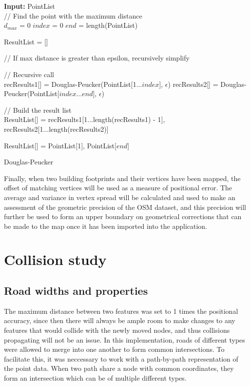 \documentclass{kththesis}
\begin{document}
\begin{algorithm}[H]
\SetAlgoLined
{}
    \textbf{Input:} PointList\\
    // Find the point with the maximum distance\\
    $d_{max}$ = 0\;
    $index$ = 0\;
    $end$ = length(PointList)\;
    

    ResultList = []\;
    
    // If max distance is greater than epsilon, recursively simplify\\
     {
        // Recursive call\\
        recResults1[] = Douglas-Peucker(PointList[1...$index$], $\epsilon$)\;
        recResults2[] = Douglas-Peucker(PointList[$index$...$end$], $\epsilon$)\;

        // Build the result list\\
        ResultList[] = {recResults1[1...length(recResults1) - 1], recResults2[1...length(recResults2)]}\;
    }{
        ResultList[] = {PointList[1], PointList[$end$]}\;
    }
    \;

    \caption{Douglas-Peucker}
\end{algorithm}

Finally, when two building footprints and their vertices have been mapped, the offset of matching vertices will be used as a measure of positional error. The average and variance in vertex spread will be calculated and used to make an assessment of the geometric precision of the OSM dataset, and this precision will further be used to form an upper boundary on geometrical corrections that can be made to the map once it has been imported into the application.

\section{Collision study}

\subsection{Road widths and properties}

The maximum distance between two features was set to 1 times the positional accuracy, since then there will always be ample room to make changes to any features that would collide with the newly moved nodes, and thus collisions propagating will not be an issue.
In this implementation, roads of different types were allowed to merge into one another to form common intersections.
To facilitate this, it was neccessary to work with a path-by-path representation of the point data.
When two path share a node with common coordinates, they form an intersection which can be of multiple different types.
\end{document}

